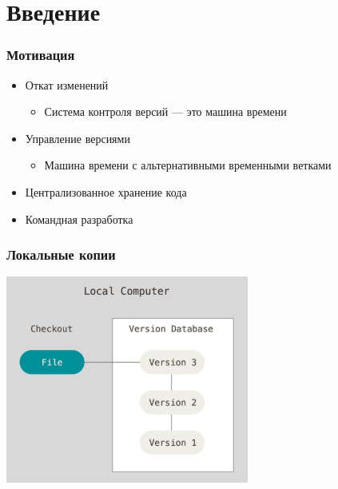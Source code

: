 \documentclass{../../slides-style}
\begin{document}
    \begin{frame}[plain]
        \titlepage
    \end{frame}

    \section{Введение}

    \begin{frame}
        \frametitle{Мотивация}
        \begin{itemize}
            \item Откат изменений
            \begin{itemize}
                \item Система контроля версий --- это машина времени
            \end{itemize}
            \item Управление версиями
            \begin{itemize}
                \item Машина времени с альтернативными временными ветками
            \end{itemize}
            \item Централизованное хранение кода
            \item Командная разработка
        \end{itemize}
    \end{frame}

    \begin{frame}
        \frametitle{Локальные копии}
        \begin{center}
            \includegraphics[width=0.6\textwidth]{localCopies.png}
        \end{center}
    \end{frame}
\end{document}
